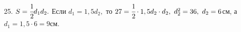 25. $S=\cfrac{1}{2}d_1d_2.$ Если $d_1=1,5d_2,$ то $27=\cfrac{1}{2}\cdot1,5d_2\cdot d_2,\ d_2^2=36,\ d_2=6$см, а $d_1=1,5\cdot6=9$см.\\
